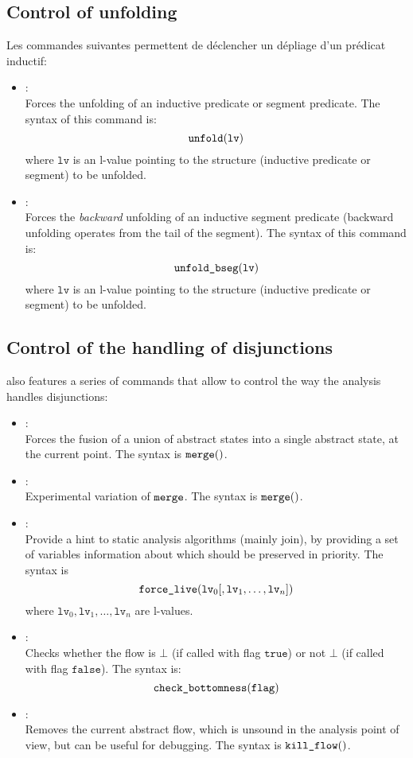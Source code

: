 \subsection{Control of unfolding}
Les commandes suivantes permettent de déclencher un dépliage d'un prédicat
inductif:
\begin{itemize}
\item[\dcommand{unfold}]: \\
  Forces the unfolding of an inductive predicate or segment predicate.
  The syntax of this command is:
  \[
  \texttt{unfold}( \texttt{lv} )
  \]
  where \( \texttt{lv} \) is an l-value pointing to the structure
  (inductive predicate or segment) to be unfolded.
\item[\dcommand{unfold\_bseg}]: \\
  Forces the {\em backward} unfolding of an inductive segment predicate
  (backward unfolding operates from the tail of the segment).
  The syntax of this command is:
  \[
  \texttt{unfold\_bseg}( \texttt{lv} )
  \]
  where \( \texttt{lv} \) is an l-value pointing to the structure
  (inductive predicate or segment) to be unfolded.
\end{itemize}

\subsection{Control of the handling of disjunctions}
\memcad also features a series of commands that allow to control the
way the analysis handles disjunctions:
\begin{itemize}
\item[\dcommand{merge}] \optadv: \\
  Forces the fusion of a union of abstract states into a single abstract
  state, at the current point.
  The syntax is \( \texttt{merge}( ) \).
\item[\dcommand{sel\_merge}] \optdev: \\
  Experimental variation of \( \texttt{merge} \).
  The syntax is \( \texttt{merge}( ) \).
\item[\dcommand{force\_live}] \optdev: \\
  Provide a hint to static analysis algorithms (mainly join), by providing
  a set of variables information about which should be preserved in priority.
  The syntax is
  \[
  \texttt{force\_live}( \texttt{lv}_0 [, \texttt{lv}_1, \ldots,
  \texttt{lv}_n ] )
  \]
  where \( \texttt{lv}_0, \texttt{lv}_1, \ldots, \texttt{lv}_n \) are
  l-values.
\item[\dcommand{check\_bottomness}]: \\
  Checks whether the flow is \( \bot \) (if called with flag
  \( \texttt{true} \)) or not \( \bot \) (if called with flag
  \( \texttt{false} \)).
  The syntax is:
  \[
  \texttt{check\_bottomness}( \texttt{flag} )
  \]
\item[\dcommand{kill\_flow}] \optdev: \\
  Removes the current abstract flow, which is unsound in the analysis point
  of view, but can be useful for debugging.
  The syntax is \( \texttt{kill\_flow}( ) \).
\end{itemize}


